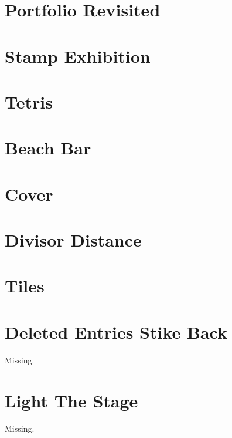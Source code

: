 \documentclass[a4paper, 10pt]{article}
\let\stdsection\section
\renewcommand\section{\newpage\stdsection}
\newcommand{\includecode}[1]{
    }
\begin{document}
    \section{Portfolio Revisited}
        \includecode{../problems/w10/Portfolios_Revisited/PortfolioRevisited1.cpp}
        
    \section{Stamp Exhibition}
        \includecode{../problems/w10/Stamp_Exhibition/StampExhibition1.cpp}
        
    \section{Tetris}
        \includecode{../problems/w10/Tetris/Tetris1.cpp}
 
    
    \section{Beach Bar}
        \includecode{../problems/w11/Beach_Bar/BeachBar1.cpp}
        
    \section{Cover}
        \includecode{../problems/w11/Cover/Cover1.cpp}
        
    \section{Divisor Distance}
        \includecode{../problems/w11/Divisor_Distance/DivisorDistance1.cpp}
        
    \section{Tiles}
        \includecode{../problems/w11/Tiles/Tiles1.cpp}
        
    
    \section{Deleted Entries Stike Back}
        Missing.
        
    \section{Light The Stage}
        Missing.
        
\end{document}
